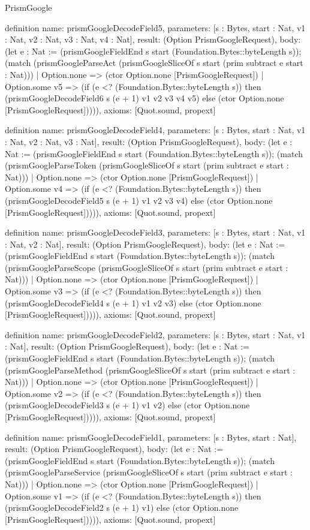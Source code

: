 \begin{lexlean}{PrismGoogle}
\begin{semanticmodule}
definition{
  name: prismGoogleDecodeField5,
  parameters: [s : Bytes, start : Nat, v1 : Nat, v2 : Nat, v3 : Nat, v4 : Nat],
  result: (Option PrismGoogleRequest),
  body: (let e : Nat := (prismGoogleFieldEnd s start (Foundation.Bytes::byteLength s)); (match (prismGoogleParseAct (prismGoogleSliceOf s start (prim subtract e start : Nat)))
    | Option.none => (ctor Option.none [PrismGoogleRequest])
    | Option.some v5 => (if (e <? (Foundation.Bytes::byteLength s)) then (prismGoogleDecodeField6 s (e + 1) v1 v2 v3 v4 v5) else (ctor Option.none [PrismGoogleRequest])))),
  axioms: [Quot.sound, propext]
}

definition{
  name: prismGoogleDecodeField4,
  parameters: [s : Bytes, start : Nat, v1 : Nat, v2 : Nat, v3 : Nat],
  result: (Option PrismGoogleRequest),
  body: (let e : Nat := (prismGoogleFieldEnd s start (Foundation.Bytes::byteLength s)); (match (prismGoogleParseToken (prismGoogleSliceOf s start (prim subtract e start : Nat)))
    | Option.none => (ctor Option.none [PrismGoogleRequest])
    | Option.some v4 => (if (e <? (Foundation.Bytes::byteLength s)) then (prismGoogleDecodeField5 s (e + 1) v1 v2 v3 v4) else (ctor Option.none [PrismGoogleRequest])))),
  axioms: [Quot.sound, propext]
}

definition{
  name: prismGoogleDecodeField3,
  parameters: [s : Bytes, start : Nat, v1 : Nat, v2 : Nat],
  result: (Option PrismGoogleRequest),
  body: (let e : Nat := (prismGoogleFieldEnd s start (Foundation.Bytes::byteLength s)); (match (prismGoogleParseScope (prismGoogleSliceOf s start (prim subtract e start : Nat)))
    | Option.none => (ctor Option.none [PrismGoogleRequest])
    | Option.some v3 => (if (e <? (Foundation.Bytes::byteLength s)) then (prismGoogleDecodeField4 s (e + 1) v1 v2 v3) else (ctor Option.none [PrismGoogleRequest])))),
  axioms: [Quot.sound, propext]
}

definition{
  name: prismGoogleDecodeField2,
  parameters: [s : Bytes, start : Nat, v1 : Nat],
  result: (Option PrismGoogleRequest),
  body: (let e : Nat := (prismGoogleFieldEnd s start (Foundation.Bytes::byteLength s)); (match (prismGoogleParseMethod (prismGoogleSliceOf s start (prim subtract e start : Nat)))
    | Option.none => (ctor Option.none [PrismGoogleRequest])
    | Option.some v2 => (if (e <? (Foundation.Bytes::byteLength s)) then (prismGoogleDecodeField3 s (e + 1) v1 v2) else (ctor Option.none [PrismGoogleRequest])))),
  axioms: [Quot.sound, propext]
}

definition{
  name: prismGoogleDecodeField1,
  parameters: [s : Bytes, start : Nat],
  result: (Option PrismGoogleRequest),
  body: (let e : Nat := (prismGoogleFieldEnd s start (Foundation.Bytes::byteLength s)); (match (prismGoogleParseService (prismGoogleSliceOf s start (prim subtract e start : Nat)))
    | Option.none => (ctor Option.none [PrismGoogleRequest])
    | Option.some v1 => (if (e <? (Foundation.Bytes::byteLength s)) then (prismGoogleDecodeField2 s (e + 1) v1) else (ctor Option.none [PrismGoogleRequest])))),
  axioms: [Quot.sound, propext]
}


\end{semanticmodule}
\end{lexlean}
